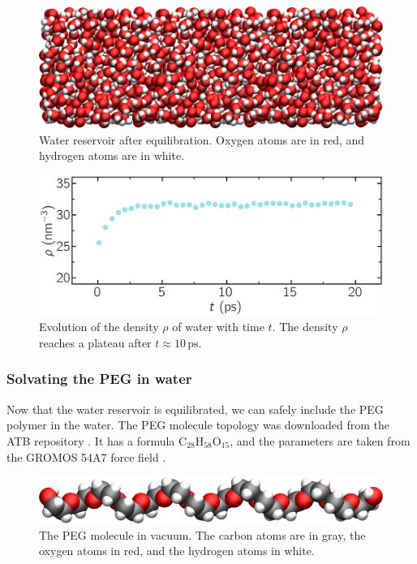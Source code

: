 \documentclass[9pt,tutorial]{livecoms}
\begin{document}
\begin{figure}
\centering
\includegraphics[width=\linewidth]{PEG-water}
\caption{Water reservoir after equilibration. Oxygen atoms are in red, and hydrogen
atoms are in white.}
\label{fig:PEG-water}
\end{figure}

\begin{figure}
\centering
\includegraphics[width=\linewidth]{PEG-density}
\caption{Evolution of the density $\rho$ of water with time $t$. The density $\rho$
reaches a plateau after $t \approx 10\,\text{ps}$.}
\label{fig:PEG-density}
\end{figure}

\subsubsection{Solvating the PEG in water}
Now that the water reservoir is equilibrated, we can safely include the PEG polymer
in the water. The PEG molecule topology was downloaded from the ATB repository
\cite{malde2011automated, oostenbrink2004biomolecular}. It has a formula
$\text{C}_{28}\text{H}_{58}\text{O}_{15}$, and the parameters are taken from
the GROMOS 54A7 force field \cite{schmid2011definition}.

\begin{figure}
\centering
\includegraphics[width=\linewidth]{PEG-in-vacuum}
\caption{The PEG molecule in vacuum. The carbon atoms are in gray, the oxygen
atoms in red, and the hydrogen atoms in white.}
\label{fig:PEG-in-vacuum}
\end{figure}
\end{document}

